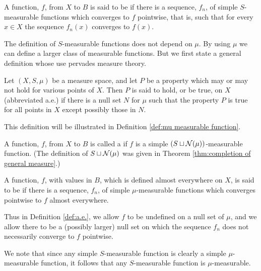\begin{definition}
A function, $f$, from $X$ to $B$ is said to be  if there is a sequence, $f_n$, of simple $S$-measurable functions which converges to $f$ pointwise, that is, such that for every $x\in X$ the sequence $f_n(x)$ converges to $f(x)$.
\end{definition}

The definition of $S$-measurable functions does not depend on $\mu$. By using $\mu$ we can define a larger class of measurable functions. But we first state a general definition whose use pervades measure theory.

\begin{definition}\label{def:a.e.}
Let $(X,S,\mu)$ be a measure space, and let $P$ be a property which may or may not hold for various points of $X$. Then $P$ is said to hold, or be true,  on $X$ (abbreviated a.e.) if there is a null set $N$ for $\mu$ such that the property $P$ is true for all points in $X$ except possibly those in $N$.
\end{definition}

This definition will be illustrated in Definition \ref{def:mu measurable function}.

\begin{definition}
A function, $f$, from $X$ to $B$ is called a  if $f$ is a simple $(S\sqcup{\cal N}(\mu))$-measurable function. (The definition of $S\sqcup{\cal N}(\mu)$ was given in Theorem \ref{thm:completion of general measure}.)
\end{definition}

\begin{definition}\label{def:mu measurable function}
A function, $f$, with values in $B$, which is defined almost everywhere on $X$, is said to be  if there is a sequence, $f_n$, of simple $\mu$-measurable functions which converges pointwise to $f$ almost everywhere.
\end{definition}

Thus in Definition \ref{def:a.e.}, we allow $f$ to be undefined on a null set of $\mu$, and we allow there to be a (possibly larger) null set on which the sequence $f_n$ does not necessarily converge to $f$ pointwise.

We note that since any simple $S$-measurable function is clearly a simple $\mu$-measurable function, it follows that any $S$-measurable function is $\mu$-measurable.

